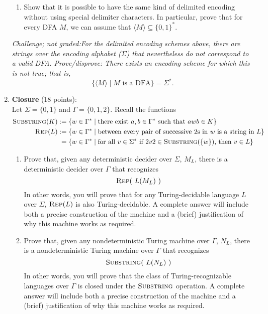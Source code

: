 \begin{enumerate}
\begin{enumerate}
\item\gradeComplete Show that it is possible to have the same kind of delimited encoding without 
using special delimiter characters. In particular, prove that for every DFA $M$, 
we can assume that $\langle M \rangle \subseteq \{0,1\}^*$.

\end{enumerate}

\noindent\textit{Challenge; not graded:\newline For the delimited encoding schemes above, 
there are strings over the encoding alphabet 
($\Sigma$) that nevertheless do not correspond to a valid DFA. \newline \newline
Prove/disprove: There exists an encoding scheme for which this is not true; that is, 
\[\{ \langle M \rangle \mid M \text{ is a DFA}\} = \Sigma^*.\]}

\vfill


\item \textbf{Closure} (18 points): \\
Let $\Sigma = \{0,1\}$ and $\Gamma = \{0,1,2\}$. Recall the functions
    \begin{align*}
    \textsc{Substring}(K) &:= \{ w \in \Gamma^* \mid \text{there exist } a,b \in \Gamma^* \text{ such that } awb \in K\} \\
    \textsc{Rep}(L) &:= \{ w \in \Gamma^* \mid \text{between every 
    pair of successive $2$s in $w$ is a string in $L$}\}\\
    &\phantom{:}=\{w \in \Gamma^* \mid \text{for all } v \in \Sigma^* \text{ if } 2v2 \in \textsc{Substring}(\{w\})  \text{, then } v \in L\}
    \end{align*}
\begin{enumerate}
    \item\gradeCorrectFirst Prove that, given any deterministic decider
    over $\Sigma$, $M_L$, there is a deterministic decider over 
    $\Gamma$ that recognizes $$\textsc{Rep}(~L(M_L)~)$$
    In other words, you 
    will prove that for any Turing-decidable language $L$ over $\Sigma$, 
    $\textsc{Rep}(L)$
    is also Turing-decidable. A complete answer will 
    include both a precise construction of the machine and a 
    (brief) justification of why this machine works as required.
    
    \item\gradeCorrect Prove that, given any nondeterministic Turing machine over 
    $\Gamma$, $N_L$, there is a nondeterministic Turing machine over 
    $\Gamma$ that recognizes $$\textsc{Substring}(~L(N_L)~)$$
    In other words, you will prove that the class of Turing-recognizable languages 
    over $\Gamma$ is closed 
    under the $\textsc{Substring}$ operation.
     A complete answer will 
    include both a precise construction of the machine and a 
    (brief) justification of why this machine works as required.
    

\end{enumerate}
\end{enumerate}
